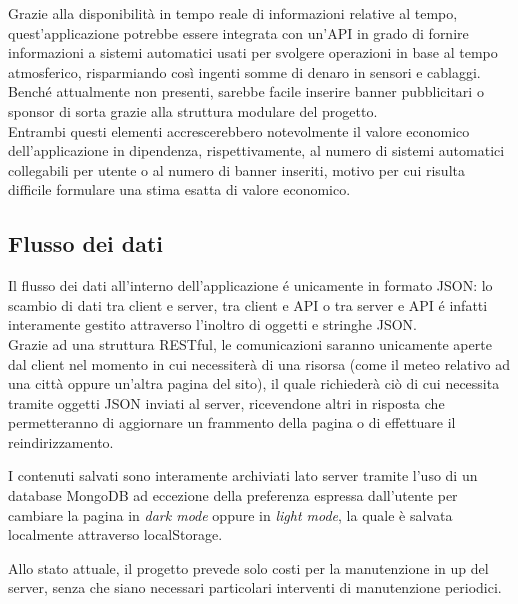 \vspace{5mm}

Grazie alla disponibilità in tempo reale di informazioni relative al tempo, quest'applicazione potrebbe essere integrata con
un'API in grado di fornire informazioni a sistemi automatici usati per svolgere operazioni in base al tempo atmosferico,
risparmiando così ingenti somme di denaro in sensori e cablaggi.\\
Benché attualmente non presenti, sarebbe facile inserire banner pubblicitari o sponsor di sorta grazie alla struttura modulare
del progetto.\\
Entrambi questi elementi accrescerebbero notevolmente il valore economico dell'applicazione in dipendenza, rispettivamente, al
numero di sistemi automatici collegabili per utente o al numero di banner inseriti, motivo per cui risulta difficile formulare
una stima esatta di valore economico.

\subsection{Flusso dei dati}

Il flusso dei dati all'interno dell'applicazione é unicamente in formato JSON: lo scambio di dati tra client e server, tra
client e API o tra server e API é infatti interamente gestito attraverso l'inoltro di oggetti e stringhe JSON.\\
Grazie ad una struttura RESTful, le comunicazioni saranno unicamente aperte dal client nel momento in cui necessiterà di una risorsa
(come il meteo relativo ad una città oppure un'altra pagina del sito), il quale richiederà ciò di cui necessita tramite
oggetti JSON inviati al server, ricevendone altri in risposta che permetteranno di aggiornare un frammento della pagina o di effettuare
il reindirizzamento.

\vspace{5mm}

I contenuti salvati sono interamente archiviati lato server tramite l'uso di un database MongoDB ad eccezione della preferenza
espressa dall'utente per cambiare la pagina in \emph{dark mode} oppure in \emph{light mode}, la quale è salvata localmente attraverso
localStorage.

\vspace{5mm}

Allo stato attuale, il progetto prevede solo costi per la manutenzione in up del server, senza che siano necessari particolari
interventi di manutenzione periodici.

